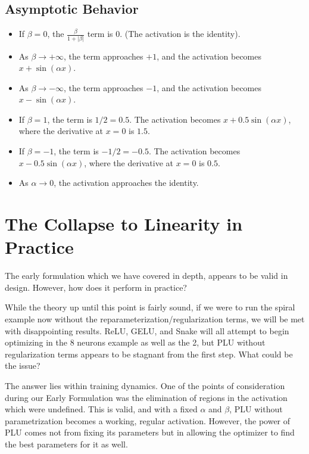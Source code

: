 \documentclass[11pt, letterpaper]{article}
\begin{document}
\subsection{Asymptotic Behavior}
\begin{itemize}
    \item If $\beta = 0$, the $\frac{\beta}{1 + \lvert\beta\rvert}$ term is 0. (The activation is the identity).
    \item As $\beta \to +\infty$, the term approaches $+1$, and the activation becomes $x + \sin(\alpha x)$.
    \item As $\beta \to -\infty$, the term approaches $-1$, and the activation becomes $x - \sin(\alpha x)$.
    \item If $\beta = 1$, the term is $1/2 = 0.5$. The activation becomes $x + 0.5 \sin(\alpha x)$, where the derivative at $x=0$ is $1.5$.
    \item If $\beta = -1$, the term is $-1/2 = -0.5$. The activation becomes $x - 0.5 \sin(\alpha x)$, where the derivative at $x=0$ is $0.5$.
    \item As $\alpha \to 0$, the activation approaches the identity.
\end{itemize}

\section{The Collapse to Linearity in Practice}

The early formulation which we have covered in depth, appears to be valid in design. However, how does it perform in practice?

While the theory up until this point is fairly sound, if we were to run the spiral example now without the reparameterization/regularization terms, we will be met with disappointing results. ReLU, GELU, and Snake will all attempt to begin optimizing in the 8 neurons example as well as the 2, but PLU without regularization terms appears to be stagnant from the first step. What could be the issue?

The answer lies within training dynamics. One of the points of consideration during our Early Formulation was the elimination of regions in the activation which were undefined. This is valid, and with a fixed $\alpha$ and $\beta$, PLU without parametrization becomes a working, regular activation. However, the power of PLU comes not from fixing its parameters but in allowing the optimizer to find the best parameters for it as well.
\end{document}
